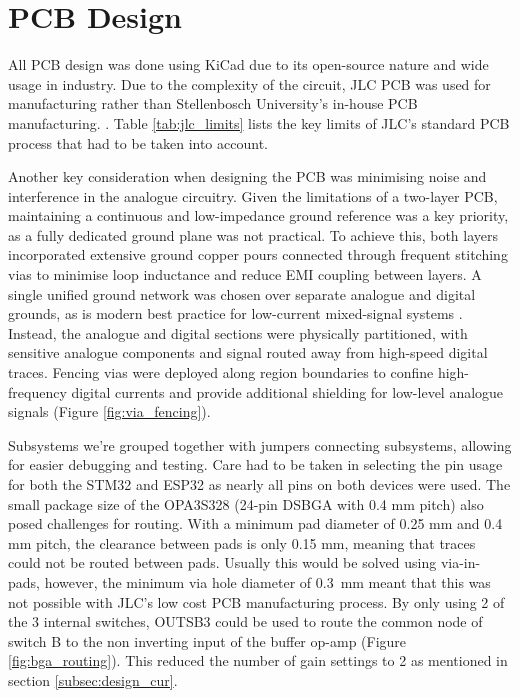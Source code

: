\section{PCB Design}\label{sec:PCB}

All PCB design was done using KiCad due to its open-source nature and wide usage in industry. Due to the complexity of the circuit, JLC PCB was used for manufacturing rather than Stellenbosch University's in-house PCB manufacturing. . Table \ref{tab:jlc_limits} lists the key limits of JLC's standard PCB process that had to be taken into account. 

Another key consideration when designing the PCB was minimising noise and interference in the analogue circuitry. Given the limitations of a two-layer PCB, maintaining a continuous and low-impedance ground reference was a key priority, as a fully dedicated ground plane was not practical. To achieve this, both layers incorporated extensive ground copper pours connected through frequent stitching vias to minimise loop inductance and reduce \ac{EMI} coupling between layers. A single unified ground network was chosen over separate analogue and digital grounds, as is modern best practice for low-current mixed-signal systems \cite{WhatAreBasic}. Instead, the analogue and digital sections were physically partitioned, with sensitive analogue components and signal routed away from high-speed digital traces. Fencing vias were deployed along region boundaries to confine high-frequency digital currents and provide additional shielding for low-level analogue signals (Figure \ref{fig:via_fencing}).

Subsystems we're grouped together with jumpers connecting subsystems, allowing for easier debugging and testing. Care had to be taken in selecting the pin usage for both the STM32 and ESP32 as nearly all pins on both devices were used. The small package size of the OPA3S328 (24-pin DSBGA with 0.4 mm pitch) also posed challenges for routing. With a minimum pad diameter of 0.25 mm and 0.4 mm pitch, the clearance between pads is only 0.15 mm, meaning that traces could not be routed between pads. Usually this would be solved using via-in-pads, however, the minimum via hole diameter of 0.3 mm meant that this was not possible with JLC's low cost PCB manufacturing process. By only using 2 of the 3 internal switches, OUTSB3 could be used to route the common node of switch B to the non inverting input of the buffer op-amp (Figure \ref{fig:bga_routing}). This reduced the number of gain settings to 2 as mentioned in section \ref{subsec:design_cur}. 

